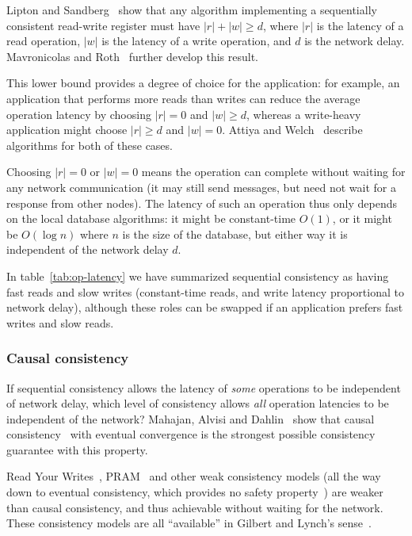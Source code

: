 \documentclass[a4paper,twocolumn,10pt]{article}
\begin{document}
Lipton and Sandberg~\cite{Lipton1988uh} show that any algorithm implementing a sequentially
consistent read-write register must have $|r| + |w| \geq d$, where $|r|$ is the latency of a read
operation, $|w|$ is the latency of a write operation, and $d$ is the network delay. Mavronicolas
and Roth~\cite{Mavronicolas1999eb} further develop this result.

This lower bound provides a degree of choice for the application: for example, an application that
performs more reads than writes can reduce the average operation latency by choosing $|r| = 0$ and
$|w| \geq d$, whereas a write-heavy application might choose $|r| \geq d$ and $|w| = 0$. Attiya and
Welch~\cite{Attiya1994gw} describe algorithms for both of these cases.

Choosing $|r| = 0$ or $|w| = 0$ means the operation can complete without waiting for any network
communication (it may still send messages, but need not wait for a response from other nodes). The
latency of such an operation thus only depends on the local database algorithms: it might be
constant-time $O(1)$, or it might be $O(\log n)$ where $n$ is the size of the database, but either
way it is independent of the network delay $d$.

In table~\ref{tab:op-latency} we have summarized sequential consistency as having fast reads and
slow writes (constant-time reads, and write latency proportional to network delay), although these
roles can be swapped if an application prefers fast writes and slow reads.

\subsubsection{Causal consistency}

If sequential consistency allows the latency of \emph{some} operations to be independent of network
delay, which level of consistency allows \emph{all} operation latencies to be independent of the
network? Mahajan, Alvisi and Dahlin~\cite{Mahajan2011wz} show that causal
consistency~\cite{Ahamad1995gl} with eventual convergence is the strongest possible consistency
guarantee with this property.

Read Your Writes~\cite{Terry1994fp}, PRAM~\cite{Lipton1988uh} and other weak consistency models (all
the way down to eventual consistency, which provides no safety property~\cite{Bailis2013jc}) are
weaker than causal consistency, and thus achievable without waiting for the network. These
consistency models are all ``available'' in Gilbert and Lynch's sense~\cite{Bailis2014vc}.
\end{document}
